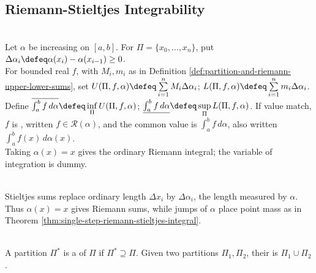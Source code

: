 \subsection{Riemann-Stieltjes Integrability}

\begin{definition} \label{def:riemann-stieltjes-integral} \\
Let $\alpha$ be increasing on $[a,b]$. For $\Pi=\{x_0,\ldots,x_n\}$, put $\Delta\alpha_i\defeq\alpha(x_i)-\alpha(x_{i-1})\geq0$.\\
For bounded real $f$, with $M_i,m_i$ as in Definition \ref{def:partition-and-riemann-upper-lower-sums}, set $U(\Pi,f,\alpha)\defeq\sum\limits_{i=1}^{n}M_i\Delta\alpha_i$; $L(\Pi,f,\alpha)\defeq\sum\limits_{i=1}^{n}m_i\Delta\alpha_i$.\\
Define $\overline{\int_a^b f\,d\alpha}\defeq\inf\limits_\Pi U(\Pi,f,\alpha)$; $\underline{\int_a^b f\,d\alpha}\defeq\sup\limits_\Pi L(\Pi,f,\alpha)$. If value match, $f$ is , written $f\in\mathcal{R}(\alpha)$, and the common value is $\int_a^b f\,d\alpha$, also written $\int_a^b f(x)\,d\alpha(x)$.\\
Taking $\alpha(x)=x$ gives the ordinary Riemann integral; the variable of integration is dummy.
\end{definition}

\begin{remark} \label{rem:stieltjes-increments-as-alpha-lengths} \\
Stieltjes sums replace ordinary length $\Delta x_i$ by $\Delta\alpha_i$, the length measured by $\alpha$.\\
Thus $\alpha(x)=x$ gives Riemann sums, while jumps of $\alpha$ place point mass as in Theorem \ref{thm:single-step-riemann-stieltjes-integral}.
\end{remark}

\begin{definition} \label{def:partition-refinement} \\
A partition $\Pi^\ast$ is a  of $\Pi$ if $\Pi^\ast\supseteq \Pi$. Given two partitions $\Pi_1,\Pi_2$, their  is $\Pi_1\cup \Pi_2$.
\end{definition}

